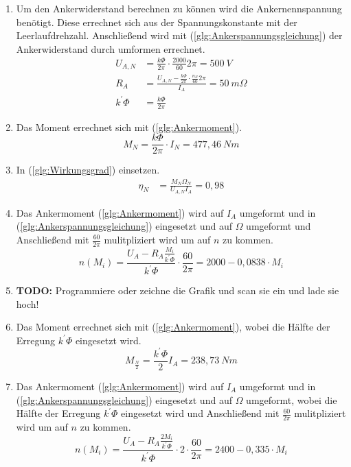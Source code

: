 \begin{solution}
\begin{enumerate}
\item Um den Ankerwiderstand berechnen zu können wird die Ankernennspannung benötigt. Diese errechnet sich aus der Spannungskonstante mit der Leerlaufdrehzahl. Anschließend wird mit (\ref{glg:Ankerspannungsgleichung}) der Ankerwiderstand durch umformen errechnet.\\
\begin{align}
U_{A,N} &= \frac{k \Phi}{2 \pi} \cdot \frac{2000}{60} 2 \pi = 500~V\\
R_A &= \frac{U_{A,N} - \frac{k \Phi}{2 \pi} \cdot \frac{n_N}{60} 2 \pi}{I_A}=50~m \Omega\\
k^{'}\Phi&= \frac{k \Phi}{2 \pi}
\end{align}
\item Das Moment errechnet sich mit (\ref{glg:Ankermoment}).\\
\begin{equation}
M_N=\frac{k \Phi}{2 \pi} \cdot I_N =477,46~Nm
\end{equation}
\item In (\ref{glg:Wirkungsgrad}) einsetzen.
\begin{align}
\eta_N &= \frac{M_N \Omega_N}{U_{A,N} I_A} = 0,98
\end{align}
\item Das Ankermoment (\ref{glg:Ankermoment}) wird auf $I_A$ umgeformt und in (\ref{glg:Ankerspannungsgleichung}) eingesetzt und auf $\Omega$ umgeformt und Anschließend mit $\frac{60}{2 \pi}$ mulitpliziert wird um auf $n$ zu kommen.
\begin{equation}
n(M_i) = \frac{U_A - R_A \frac{M_i}{k^{'} \Phi}}{k^{'}\Phi} \cdot \frac{60}{2 \pi}=2000-0,0838 \cdot M_i
\end{equation}
\item \textbf{TODO:} Programmiere oder zeichne die Grafik und scan sie ein und lade sie hoch!
\item Das Moment errechnet sich mit (\ref{glg:Ankermoment}), wobei die Hälfte der Erregung $k^{'} \Phi$ eingesetzt wird.
\begin{equation}
M_{\frac{N}{2}} = \frac{k^{'}\Phi}{2} I_A =238,73~Nm
\end{equation}
\item Das Ankermoment (\ref{glg:Ankermoment}) wird auf $I_A$ umgeformt und in (\ref{glg:Ankerspannungsgleichung}) eingesetzt und auf $\Omega$ umgeformt, wobei die Hälfte der Erregung $k^{'} \Phi$ eingesetzt wird und Anschließend mit $\frac{60}{2 \pi}$ mulitpliziert wird um auf $n$ zu kommen.
\begin{equation}
n(M_i) = \frac{U_A - R_A \frac{2 M_i}{k^{'} \Phi}}{k^{'}\Phi} \cdot 2 \cdot \frac{60}{2 \pi} =2400-0,335 \cdot M_i
\end{equation}
\end{enumerate}
\end{solution}